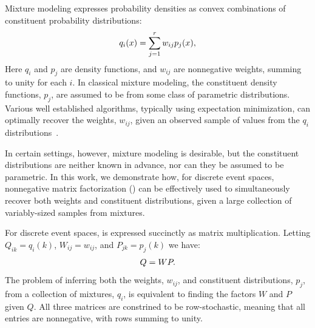 \documentclass[conference]{IEEEtran}
\title{\vspace{-0.25em}\thetitle}
\author{
{\large{Stefan~Karpinski, John~R.~Gilbert, Elizabeth~M.~Belding}} \vspace{0.25em}\\
Department of Computer Science \\
University of California, Santa Barbara \vspace{0.35em}\\
\textit{\{sgk,gilbert,ebelding\}@cs.ucsb.edu}
}
\begin{document}
\maketitle

Mixture modeling expresses probability densities as convex combinations of constituent probability distributions:
\begin{align}\eqn{mixture-model}
  q_i(x) = \sum_{j=1}^r w_{ij} p_j(x),
\end{align}
Here $q_i$ and $p_j$ are density functions, and $w_{ij}$ are nonnegative weights, summing to unity for each $i$.
In classical mixture modeling, the constituent density functions, $p_j$, are assumed to be from some class of parametric distributions.
Various well established algorithms, typically using expectation minimization, can optimally recover the weights, $w_{ij}$, given an observed sample of values from the $q_i$ distributions~\cite{McLachlan00}.

In certain settings, however, mixture modeling is desirable, but the constituent distributions are neither known in advance, nor can they be assumed to be parametric.
In this work, we demonstrate how, for discrete event spaces, nonnegative matrix factorization () can be effectively used to simultaneously recover both weights and constituent distributions, given a large collection of variably-sized samples from mixtures.

For discrete event spaces,  is expressed succinctly as matrix multiplication.
Letting $Q_{ik} = q_i(k)$, $W_{ij} = w_{ij}$, and $P_{jk} = p_j(k)$ we have:
\begin{align}\eqn{mixture-model-matrix}
  Q = WP.
\end{align}
The problem of inferring both the weights, $w_{ij}$, and constituent distributions, $p_j$, from a collection of mixtures, $q_i$, is equivalent to finding the factors $W$ and $P$ given $Q$.
All three matrices are constrined to be row-stochastic, meaning that all entries are nonnegative, with rows summing to unity.
\end{document}
